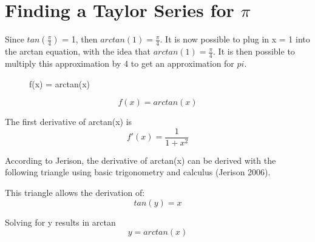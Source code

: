 \documentclass[12pt, titlepage]{article}
\begin{document}
\section{Finding a Taylor Series for \(\pi\)}
Since \(tan(\frac{\pi}{4})\) = 1, then \(arctan(1)= \frac{\pi}{4}\). It is now possible to plug in x = 1 into the arctan equation, with the idea that \(arctan(1) = \frac{\pi}{4}\). It is then possible to multiply this approximation by 4 to get an approximation for \(pi\).

\begin{figure}[H]
\centering
    \caption[]{f(x) = arctan(x)}
\end{figure}

\begin{equation*}
  f(x) = arctan(x)
\end{equation*}

The first derivative of arctan(x) is 
\begin{equation*}
f'(x) = \frac{1}{1 + x^{2}}
\end{equation*}

\pagebreak
According to Jerison, the derivative of arctan(x) can be derived with the following triangle using basic trigonometry and calculus (Jerison 2006).
\begin{figure}[H]
\centering
{}
\end{figure}

This triangle allows the derivation of:
\begin{equation*}
 tan(y) = x
\end{equation*}

Solving for y results in arctan
\begin{equation*}
  y = arctan(x)
\end{equation*}
\end{document}
